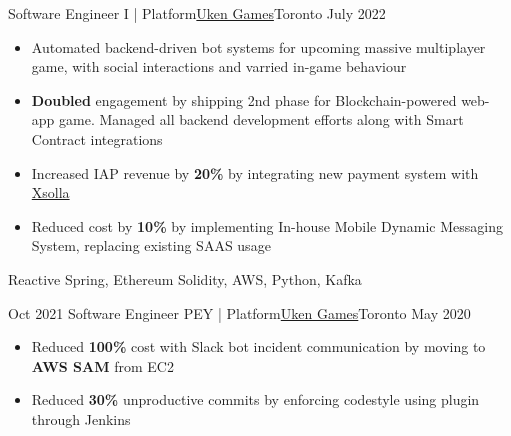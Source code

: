 %
%
%
\begin{experiences}
  \experienceCurrent
    {Software Engineer I | Platform}{\href{https://uken.com}{Uken Games}}{Toronto}
    {July 2022} {
                    \begin{itemize}
                        \setlength\itemsep{0.2em}
                        \item Automated backend-driven bot systems for upcoming massive multiplayer game, with social interactions and varried in-game behaviour

                        \item \textbf{Doubled} engagement by shipping 2nd phase for Blockchain-powered web-app game. Managed all backend development efforts along with Smart Contract integrations

                        \item Increased IAP revenue by \textbf{20\%} by integrating new payment system with \href{https://xsolla.com}{Xsolla} 

                        \item Reduced cost by \textbf{10\%} by implementing In-house Mobile Dynamic Messaging System, replacing existing SAAS usage
                    \end{itemize}
                    }
                    {Reactive Spring, Ethereum Solidity, AWS, Python, Kafka}

  \emptySeparator
  \experience
    {Oct 2021}   {Software Engineer PEY | Platform}{\href{https://uken.com}{Uken Games}}{Toronto}
    {May 2020} {
                    \begin{itemize}
                        \setlength\itemsep{0.2em}
                        \item Reduced \textbf{100\%} cost with Slack bot incident communication by moving to \textbf{AWS SAM} from EC2
                        
                        \item Reduced \textbf{30\%} unproductive commits by enforcing codestyle using  plugin through Jenkins


\end{itemize}}
\end{experiences}
